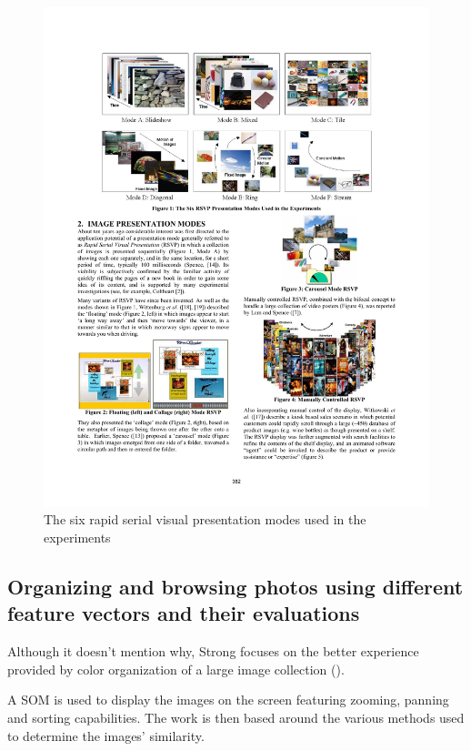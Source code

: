 \begin{figure}[ht]
	\centering
		\includegraphics[width=\textwidth]{imgs-RelatedWork/Cooper1}
	\caption{The six rapid serial visual presentation modes used in the experiments}
	\label{fig:Cooper1}
\end{figure}

\subsection{Organizing and browsing photos using different feature vectors and their evaluations} %
\label{sub:Strong}

Although it doesn't mention why, Strong \cite{Strong:2009p413} focuses on the better experience provided by color organization of a large image collection ().

A \ac{SOM} is used to display the images on the screen featuring zooming, panning and sorting capabilities. The work is then based around the various methods used to determine the images' similarity.

